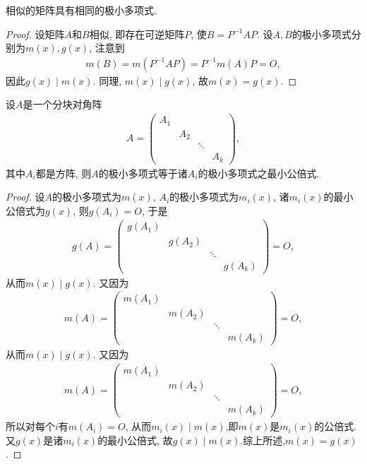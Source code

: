 \documentclass[../../main.tex]{subfiles}
\begin{document}
\begin{proposition}[相似的矩阵具有相同的极小多项式]\label{proposition:相似的矩阵具有相同的极小多项式}
相似的矩阵具有相同的极小多项式.
\end{proposition}
\begin{proof}
设矩阵$A$和$B$相似, 即存在可逆矩阵$P$, 使$B = P^{-1}AP$. 设$A, B$的极小多项式分别为$m(x), g(x)$, 注意到
\begin{align*}
m(B) = m(P^{-1}AP) = P^{-1}m(A)P = O,
\end{align*}
因此$g(x) \mid m(x)$. 同理, $m(x) \mid g(x)$, 故$m(x) = g(x)$.
\end{proof}

\begin{proposition}
设$A$是一个分块对角阵
\begin{align*}
A = \begin{pmatrix}
A_1 & & \\
& A_2 & \\
& & \ddots & \\
& & & A_k
\end{pmatrix},
\end{align*}
其中$A_i$都是方阵, 则$A$的极小多项式等于诸$A_i$的极小多项式之最小公倍式.
\end{proposition}
\begin{proof}
设$A$的极小多项式为$m(x)$, $A_i$的极小多项式为$m_i(x)$, 诸$m_i(x)$的最小公倍式为$g(x)$, 则$g(A_i) = O$, 于是
\begin{align*}
g(A) = \begin{pmatrix}
g(A_1) & & \\
& g(A_2) & \\
& & \ddots & \\
& & & g(A_k)
\end{pmatrix} = O,
\end{align*}
从而$m(x) \mid g(x)$. 又因为
\begin{align*}
m(A) = \begin{pmatrix}
m(A_1) & & \\
& m(A_2) & \\
& & \ddots & \\
& & & m(A_k)
\end{pmatrix} = O,
\end{align*}
从而$m(x) \mid g(x)$. 又因为
\begin{align*}
m(A) = \begin{pmatrix}
m(A_1) & & \\
& m(A_2) & \\
& & \ddots & \\
& & & m(A_k)
\end{pmatrix} = O,
\end{align*}
所以对每个$i$有$m(A_i) = O$, 从而$m_i(x) \mid m(x)$,即$m(x)$是$m_i(x)$的公倍式.又$g(x)$是诸$m_i(x)$的最小公倍式, 故$g(x) \mid m(x)$.综上所述,$m(x) = g(x)$.
\end{proof}
\end{document}
